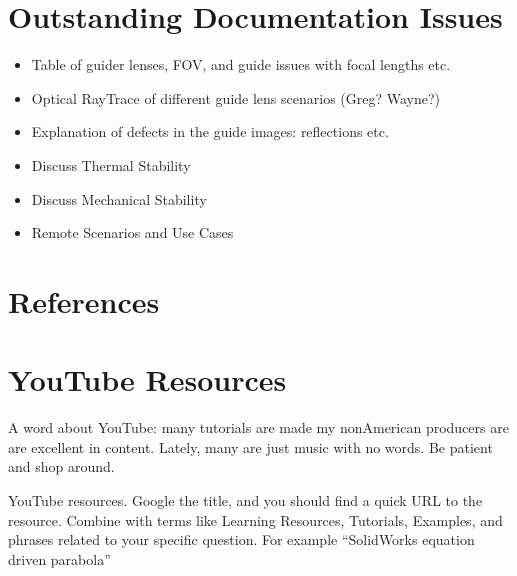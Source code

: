 \documentclass[letterpaper,10pt,english,openany,oneside]{sphinxmanual}
\begin{document}
\chapter{Outstanding Documentation Issues}
\label{\detokenize{outstanding:outstanding-documentation-issues}}\label{\detokenize{outstanding:outstanding}}\label{\detokenize{outstanding::doc}}\begin{itemize}
\item {} 
\sphinxAtStartPar
Table of guider lenses, FOV, and guide issues with focal lengths etc.

\item {} 
\sphinxAtStartPar
Optical Ray\sphinxhyphen{}Trace of different guide lens scenarios (Greg? Wayne?)

\item {} 
\sphinxAtStartPar
Explanation of defects in the guide images: reflections etc.

\item {} 
\sphinxAtStartPar
Discuss Thermal Stability

\item {} 
\sphinxAtStartPar
Discuss Mechanical Stability

\item {} 
\sphinxAtStartPar
Remote Scenarios and Use Cases

\end{itemize}


\chapter{References}
\label{\detokenize{references:references}}\label{\detokenize{references::doc}}

\chapter{YouTube Resources}
\label{\detokenize{youtube:youtube-resources}}\label{\detokenize{youtube::doc}}
\sphinxAtStartPar
A word about YouTube: many tutorials are made my
non\sphinxhyphen{}American producers are are excellent in content.
Lately, many are just music with no words. Be patient
and shop around.

\sphinxAtStartPar
YouTube resources. Google the title, and you should
find a quick URL to the resource. Combine with terms
like Learning Resources, Tutorials, Examples, and
phrases related to your specific question. For
example “SolidWorks equation driven parabola”
\end{document}
